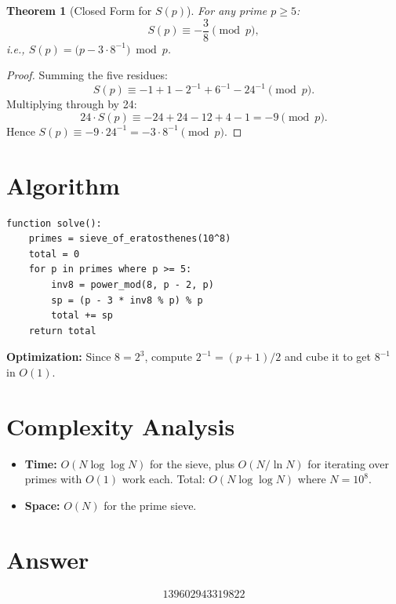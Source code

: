 \documentclass[11pt]{article}
\newtheorem{theorem}{Theorem}
\begin{document}
\begin{theorem}[Closed Form for $S(p)$]
For any prime $p \ge 5$:
\[
S(p) \equiv -\frac{3}{8} \pmod{p},
\]
i.e., $S(p) = \bigl(p - 3 \cdot 8^{-1}\bigr) \bmod p$.
\end{theorem}

\begin{proof}
Summing the five residues:
\[
S(p) \equiv -1 + 1 - 2^{-1} + 6^{-1} - 24^{-1} \pmod{p}.
\]
Multiplying through by 24:
\[
24 \cdot S(p) \equiv -24 + 24 - 12 + 4 - 1 = -9 \pmod{p}.
\]
Hence $S(p) \equiv -9 \cdot 24^{-1} = -3 \cdot 8^{-1} \pmod{p}$.
\end{proof}

\section{Algorithm}

\begin{verbatim}
function solve():
    primes = sieve_of_eratosthenes(10^8)
    total = 0
    for p in primes where p >= 5:
        inv8 = power_mod(8, p - 2, p)
        sp = (p - 3 * inv8 % p) % p
        total += sp
    return total
\end{verbatim}

\textbf{Optimization:} Since $8 = 2^3$, compute $2^{-1} = (p+1)/2$ and cube it to get $8^{-1}$ in $O(1)$.

\section{Complexity Analysis}

\begin{itemize}
\item \textbf{Time:} $O(N \log \log N)$ for the sieve, plus $O(N / \ln N)$ for iterating over primes with $O(1)$ work each. Total: $O(N \log \log N)$ where $N = 10^8$.
\item \textbf{Space:} $O(N)$ for the prime sieve.
\end{itemize}

\section{Answer}

\[
\boxed{139602943319822}
\]
\end{document}
